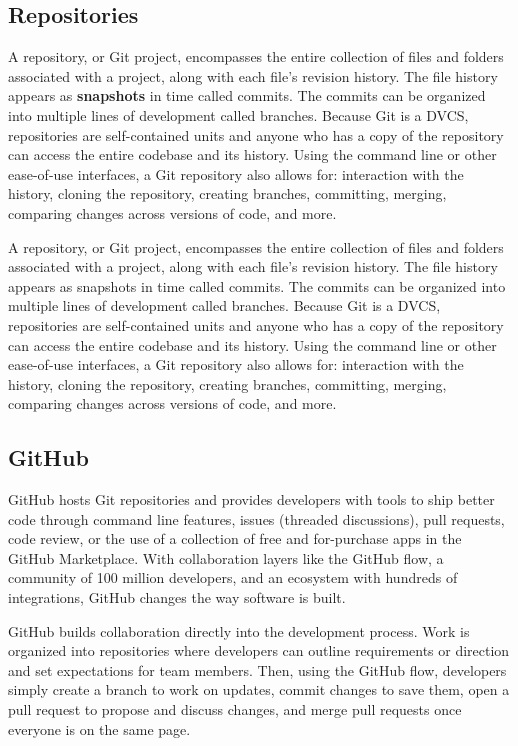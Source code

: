 \subsection{Repositories}

A repository, or Git project, encompasses the entire collection of files and folders associated with a project, along with each file's revision history. The file history appears as \textbf{snapshots} in time called commits. The commits can be organized into multiple lines of development called branches. Because Git is a DVCS, repositories are self-contained units and anyone who has a copy of the repository can access the entire codebase and its history. Using the command line or other ease-of-use interfaces, a Git repository also allows for: interaction with the history, cloning the repository, creating branches, committing, merging, comparing changes across versions of code, and more.

A repository, or Git project, encompasses the entire collection of files and folders associated with a project, along with each file's revision history. The file history appears as snapshots in time called commits. The commits can be organized into multiple lines of development called branches. Because Git is a DVCS, repositories are self-contained units and anyone who has a copy of the repository can access the entire codebase and its history. Using the command line or other ease-of-use interfaces, a Git repository also allows for: interaction with the history, cloning the repository, creating branches, committing, merging, comparing changes across versions of code, and more.

\subsection{GitHub}

GitHub hosts Git repositories and provides developers with tools to ship better code through command line features, issues (threaded discussions), pull requests, code review, or the use of a collection of free and for-purchase apps in the GitHub Marketplace. With collaboration layers like the GitHub flow, a community of 100 million developers, and an ecosystem with hundreds of integrations, GitHub changes the way software is built.

GitHub builds collaboration directly into the development process. Work is organized into repositories where developers can outline requirements or direction and set expectations for team members. Then, using the GitHub flow, developers simply create a branch to work on updates, commit changes to save them, open a pull request to propose and discuss changes, and merge pull requests once everyone is on the same page. 

